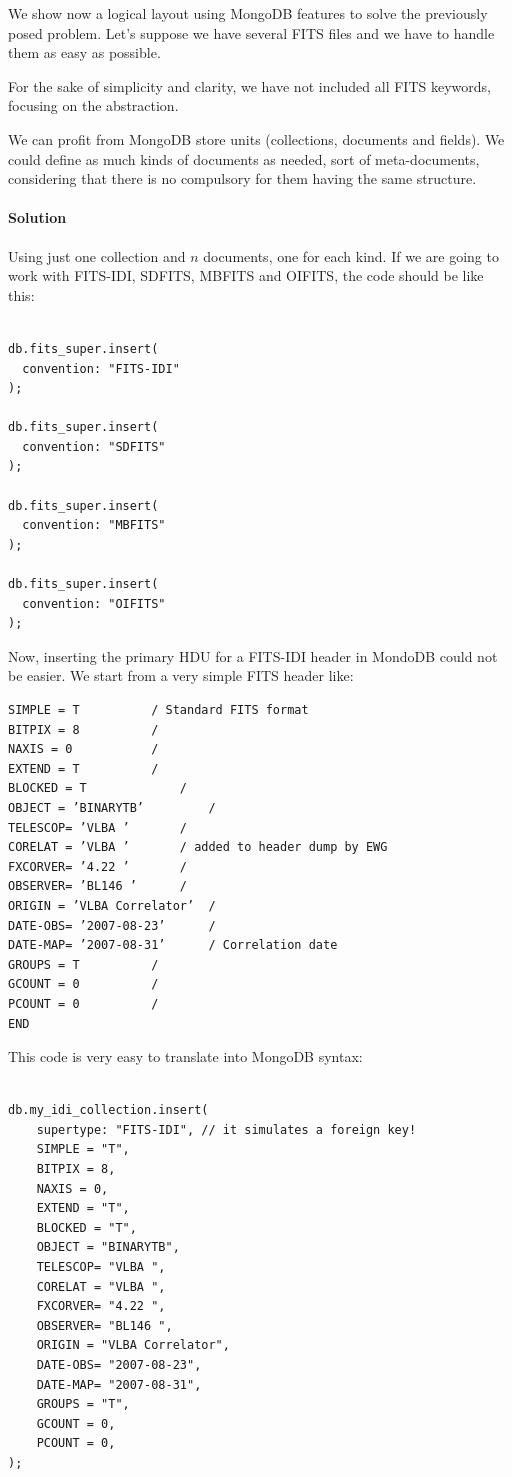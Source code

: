 We show now a logical layout using MongoDB features to solve the previously posed problem. Let's suppose we have several FITS files and we have to handle them as easy as possible.

For the sake of simplicity and clarity, we have not included all FITS keywords, focusing on the abstraction.

We can profit from MongoDB store units (collections, documents and fields). We could define as much kinds of documents as needed, sort of meta-documents, considering that there is no compulsory for them having the same structure. 

\paragraph{Solution}

Using just one collection and $n$ documents, one for each kind. If we are going to work with FITS-IDI, SDFITS, MBFITS and OIFITS, the code should be like this:

\begin{lstlisting}

db.fits_super.insert(
  convention: "FITS-IDI"
);

db.fits_super.insert(
  convention: "SDFITS"
);

db.fits_super.insert(
  convention: "MBFITS"
);

db.fits_super.insert(
  convention: "OIFITS"
);

\end{lstlisting}




Now, inserting the primary HDU for a  FITS-IDI header in MondoDB could not be easier. We start from a very simple FITS header like: \newline
\begin{verbatim}
SIMPLE = T 			/ Standard FITS format
BITPIX = 8 			/
NAXIS = 0 			/
EXTEND = T 			/
BLOCKED = T 			/
OBJECT = ’BINARYTB’ 		/
TELESCOP= ’VLBA ’ 		/
CORELAT = ’VLBA ’ 		/ added to header dump by EWG
FXCORVER= ’4.22 ’ 		/
OBSERVER= ’BL146 ’ 		/
ORIGIN = ’VLBA Correlator’ 	/
DATE-OBS= ’2007-08-23’ 		/
DATE-MAP= ’2007-08-31’ 		/ Correlation date
GROUPS = T 			/
GCOUNT = 0 			/
PCOUNT = 0 			/
END
\end{verbatim}

This code is very easy to translate into MongoDB syntax: \newline

\begin{lstlisting}

db.my_idi_collection.insert(
    supertype: "FITS-IDI", // it simulates a foreign key!
    SIMPLE = "T",
    BITPIX = 8,
    NAXIS = 0,
    EXTEND = "T",
    BLOCKED = "T",
    OBJECT = "BINARYTB",
    TELESCOP= "VLBA ",
    CORELAT = "VLBA ",
    FXCORVER= "4.22 ",
    OBSERVER= "BL146 ",
    ORIGIN = "VLBA Correlator",
    DATE-OBS= "2007-08-23",
    DATE-MAP= "2007-08-31",
    GROUPS = "T",
    GCOUNT = 0,
    PCOUNT = 0,
);

\end{lstlisting}



